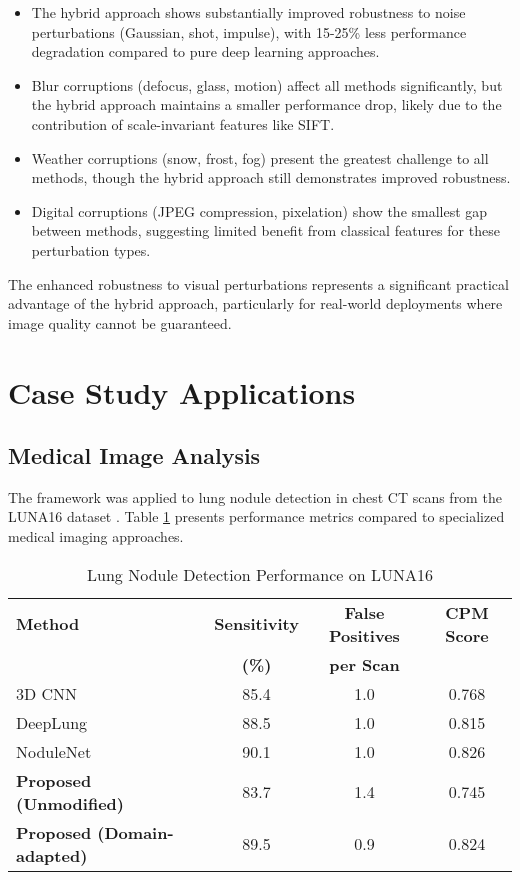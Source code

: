 \begin{itemize}
    \item The hybrid approach shows substantially improved robustness to noise perturbations (Gaussian, shot, impulse), with 15-25\% less performance degradation compared to pure deep learning approaches.
    
    \item Blur corruptions (defocus, glass, motion) affect all methods significantly, but the hybrid approach maintains a smaller performance drop, likely due to the contribution of scale-invariant features like SIFT.
    
    \item Weather corruptions (snow, frost, fog) present the greatest challenge to all methods, though the hybrid approach still demonstrates improved robustness.
    
    \item Digital corruptions (JPEG compression, pixelation) show the smallest gap between methods, suggesting limited benefit from classical features for these perturbation types.
\end{itemize}

The enhanced robustness to visual perturbations represents a significant practical advantage of the hybrid approach, particularly for real-world deployments where image quality cannot be guaranteed.

\section{Case Study Applications}

\subsection{Medical Image Analysis}
The framework was applied to lung nodule detection in chest CT scans from the LUNA16 dataset \cite{setio2017validation}. Table \ref{tab:medical_results} presents performance metrics compared to specialized medical imaging approaches.

\begin{table}[h]
\centering
\caption{Lung Nodule Detection Performance on LUNA16}
\label{tab:medical_results}
\begin{tabular}{lccc}
\hline
\textbf{Method} & \textbf{Sensitivity} & \textbf{False Positives} & \textbf{CPM Score} \\
 & \textbf{(\%)} & \textbf{per Scan} & \\
\hline
3D CNN \cite{setio2017validation} & 85.4 & 1.0 & 0.768 \\
DeepLung \cite{zhu2018deeplung} & 88.5 & 1.0 & 0.815 \\
NoduleNet \cite{tang2019nodulenet} & 90.1 & 1.0 & 0.826 \\
\hline
\textbf{Proposed (Unmodified)} & 83.7 & 1.4 & 0.745 \\
\textbf{Proposed (Domain-adapted)} & 89.5 & 0.9 & 0.824 \\
\hline
\end{tabular}
\end{table}

